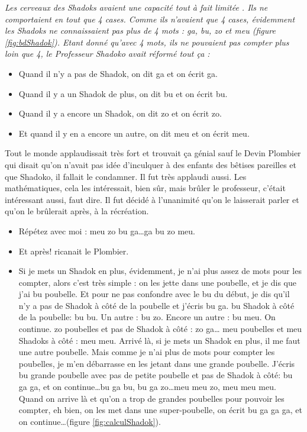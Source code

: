 \begin{td}\label{td:shadok}
\em
Les cerveaux des Shadoks avaient une capacité tout à fait limitée \cite{rouxel}.
Ils ne comportaient en tout que 4 cases.
Comme ils n'avaient que 4 cases, évidemment les Shadoks ne connaissaient 
pas plus de 4 mots :  {\sc ga, bu, zo et meu} (figure \ref{fig:bdShadok}).
Etant donné qu'avec 4 mots, ils ne pouvaient pas compter plus loin que 4,
le Professeur Shadoko avait réformé tout ça :
\begin{itemize}
\item Quand il n'y a pas de Shadok, on dit {\sc ga} et on écrit {\sc ga}.
\item Quand il y a un Shadok de plus, on dit {\sc bu} et on écrit {\sc bu}.
\item Quand il y a encore un Shadok, on dit {\sc zo} et on écrit {\sc zo}.
\item Et quand il y en a encore un autre, on dit {\sc meu} et on écrit {\sc meu}.
\end{itemize}
Tout le monde applaudissait très fort et trouvait ça génial sauf le Devin Plombier 
qui disait qu'on n'avait pas idée d'inculquer à des enfants des bêtises pareilles 
et que Shadoko, il fallait le condamner. 
Il fut très applaudi aussi. Les mathématiques, 
cela les intéressait, bien sûr, mais brûler le professeur, c'était intéressant aussi, faut dire. 
Il fut décidé à l'unanimité qu'on le laisserait parler et qu'on le brûlerait après, à la récréation.
\begin{itemize}
\item Répétez avec moi : {\sc meu} {\sc zo} {\sc bu} {\sc ga}\ldots {\sc ga} {\sc bu} {\sc zo} {\sc meu}.
\item Et après! ricanait le Plombier.
\item Si je mets un Shadok en plus, évidemment, je n'ai plus assez 
de mots pour les compter, alors c'est très simple : on les jette dans une poubelle, 
et je dis que j'ai {\sc bu} poubelle. Et pour ne pas confondre avec le {\sc bu} du début, 
je dis qu'il n'y a pas de Shadok à côté de la poubelle et j'écris {\sc bu} {\sc ga}. 
{\sc bu} Shadok à côté de la poubelle: {\sc bu} {\sc bu}. Un autre : {\sc bu} {\sc zo}. Encore un autre : {\sc bu} {\sc meu}. 
On continue. {\sc zo} poubelles et pas de Shadok à côté : {\sc zo} {\sc ga}\ldots 
{\sc meu} poubelles et {\sc meu} Shadoks à côté : {\sc meu} {\sc meu}. 
Arrivé là, si je mets un Shadok en plus, il me faut une autre poubelle. 
Mais comme je n'ai plus de mots pour compter les poubelles, je m'en débarrasse 
en les jetant dans une grande poubelle. 
J'écris {\sc bu} grande poubelle avec pas de petite poubelle 
et pas de Shadok à côté: {\sc bu} {\sc ga} {\sc ga}, et on continue\ldots {\sc bu} {\sc ga} {\sc bu}, 
{\sc bu} {\sc ga} {\sc zo}\ldots {\sc meu} {\sc meu} {\sc zo}, {\sc meu} {\sc meu} {\sc meu}.
Quand on arrive là et qu'on a trop de grandes poubelles pour pouvoir les compter, 
eh bien, on les met dans une super-poubelle, on écrit {\sc bu} {\sc ga} {\sc ga} {\sc ga}, 
et on continue\ldots (figure \ref{fig:calculShadok}).
\end{itemize}


\end{td}
